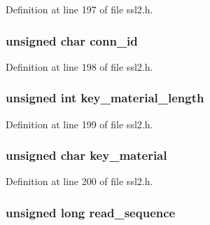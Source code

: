 Definition at line 197 of file ssl2.\+h.

\subsubsection[{\texorpdfstring{conn\+\_\+id}{conn_id}}]{\setlength{\rightskip}{0pt plus 5cm}unsigned char conn\+\_\+id}\hypertarget{structssl2__state__st_a6bdd35f4cb5e1196dc4b7ce02b5bed55}{}\label{structssl2__state__st_a6bdd35f4cb5e1196dc4b7ce02b5bed55}


Definition at line 198 of file ssl2.\+h.

\subsubsection[{\texorpdfstring{key\+\_\+material\+\_\+length}{key_material_length}}]{\setlength{\rightskip}{0pt plus 5cm}unsigned int key\+\_\+material\+\_\+length}\hypertarget{structssl2__state__st_af60f500a4eaefb9a6756ff7c1f74d00c}{}\label{structssl2__state__st_af60f500a4eaefb9a6756ff7c1f74d00c}


Definition at line 199 of file ssl2.\+h.

\subsubsection[{\texorpdfstring{key\+\_\+material}{key_material}}]{\setlength{\rightskip}{0pt plus 5cm}unsigned char key\+\_\+material}\hypertarget{structssl2__state__st_aa698c36f7ec4edb8a3184beebdfa2576}{}\label{structssl2__state__st_aa698c36f7ec4edb8a3184beebdfa2576}


Definition at line 200 of file ssl2.\+h.

\subsubsection[{\texorpdfstring{read\+\_\+sequence}{read_sequence}}]{\setlength{\rightskip}{0pt plus 5cm}unsigned long read\+\_\+sequence}\hypertarget{structssl2__state__st_a6086e8942a30ca97a9571d3b2d18ab66}{}\label{structssl2__state__st_a6086e8942a30ca97a9571d3b2d18ab66}


